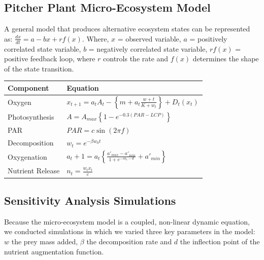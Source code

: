 \documentclass[a0,landscape]{a0poster}
\begin{document}
\begin{multicols}{3}
\subsection*{Pitcher Plant Micro-Ecosystem Model}

A general model that produces alternative ecosystem states can be
represented as: $\frac{dx}{dt} = a - bx + r f(x)$. Where, $x$ =
observed variable, $a$ = positively correlated state variable, $b$ =
negatively correlated state variable, $rf(x)$ = positive feedback
loop, where $r$ controls the rate and $f(x)$ determines the shape of
the state transition.


\begin{center}\vspace{1cm}
\begin{tabular}{l l}
\toprule
\textbf{Component} & Equation \\
\midrule
Oxygen & $x_{t+1} = a_t A_t - \left\{m + a_t \frac{w+t}{K + w_t}\right\} + D_t(x_t)$ \\
Photosynthesis & $  A = A_{max} \left\{ 1 - e^{-0.3 (PAR - LCP)} \right\} $\\
PAR & $PAR = c \sin(2 \pi f)$\\
Decomposition & $w_t = e^{-\beta w_0 t}$\\
Oxygenation & $a_t+1 = a_t \left\{ \frac{a'_{max}-a'_{min}}{1+e^{-s n_t - d}} + a'_{min}\right\}$ \\
Nutrient Release & $n_t = \frac{w_t x_t}{c}$ \\
\bottomrule
\end{tabular}
\end{center}\vspace{1cm}

\subsection*{Sensitivity Analysis Simulations}

Because the micro-ecosystem model is a coupled, non-linear dynamic
equation, we conducted simulations in which we varied three key
parameters in the model: $w$ the prey mass added, $\beta$ the
decomposition rate and $d$ the inflection point of the nutrient
augmentation function. 



\end{multicols}
\end{document}
